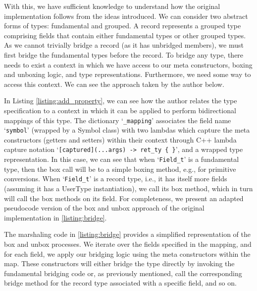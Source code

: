 With this, we have sufficient knowledge to understand how the original implementation follows from the ideas introduced. We can consider two abstract forms of types: fundamental and grouped. A record represents a grouped type comprising fields that contain either fundamental types or other grouped types. As we cannot trivially bridge a record (as it has unbridged members), we must first bridge the fundamental types before the record. To bridge any type, there needs to exist a context in which we have access to our meta constructors, boxing and unboxing logic, and type representations. Furthermore, we need some way to access this context. We can see the approach taken by the author below. 

\begin{listing}[ht!]
  
  \caption{Add property function}
  \label{listing:add_property}
\end{listing}

In Listing \ref{listing:add_property}, we can see how the author relates the type specification to a context in which it can be applied to perform bidirectional mappings of this type. The dictionary `\texttt{\_mapping}' associates the field name `\texttt{symbol}' (wrapped by a Symbol class) with two lambdas which capture the meta constructors (getters and setters) within their context through C++ lambda capture notation `\texttt{[captured](...args) -> ret\_ty \{ \}}', and a wrapped type representation. In this case, we can see that when `\texttt{Field\_t}' is a fundamental type, then the box call will be to a simple boxing method, e.g., for primitive conversions. When `\texttt{Field\_t}' is a record type, i.e., it has itself more fields (assuming it has a UserType instantiation), we call its box method, which in turn will call the box methods on its field. For completeness, we present an adapted pseudocode version of the box and unbox approach of the original implementation in \ref{listing:bridge}.

\begin{listing}[ht!]
  
  \caption{Bridge implementation}
  \label{listing:bridge}
\end{listing}

The marshaling code in \ref{listing:bridge} provides a simplified representation of the box and unbox processes. We iterate over the fields specified in the mapping, and for each field, we apply our bridging logic using the meta constructors within the map. These constructors will either bridge the type directly by invoking the fundamental bridging code or, as previously mentioned, call the corresponding bridge method for the record type associated with a specific field, and so on.

